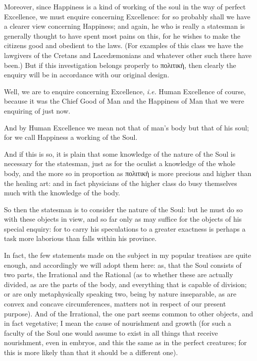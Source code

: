 
Moreover, since Happiness is a kind of working of the soul in the way of
perfect Excellence, we must enquire concerning Excellence: for so probably
shall we have a clearer view concerning Happiness; and again, he who is really
a statesman is generally thought to have spent most pains on this, for he
wishes to make the citizens good and obedient to the laws. (For examples of
this class we have the lawgivers of the Cretans and Lacedæmonians and whatever
other such there have been.) But if this investigation belongs properly to
πολιτικὴ, then clearly the enquiry
will be in accordance with our original design.

Well, we are to enquire concerning Excellence, \emph{i.e.} Human Excellence of
course, because it was the Chief Good of Man and the Happiness of Man that we
were enquiring of just now.

And by Human Excellence we mean not that of man’s body but that of his
soul; for we call Happiness a working of the Soul.

And if this is so, it is plain that some knowledge of the nature of the Soul is
necessary for the statesman, just as for the oculist a knowledge of the whole
body, and the more so in proportion as
πολιτικὴ is more precious and higher
than the healing art: and in fact physicians of the higher class do busy
themselves much with the knowledge of the body.

So then the statesman is to consider the nature of the Soul: but he must do so
with these objects in view, and so far only as may suffice for the objects of
his special enquiry: for to carry his speculations to a greater exactness is
perhaps a task more laborious than falls within his province.

In fact, the few statements made on the subject in my popular treatises are
quite enough, and accordingly we will adopt them here: as, that the Soul
consists of two parts, the Irrational and the Rational (as to whether these are
actually divided, as are the parts of the body, and everything that is capable
of division; or are only metaphysically speaking two, being by nature
inseparable, as are convex and concave circumferences, matters not in respect
of our present purpose). And of the Irrational, the one part seems common to
other objects, and in fact vegetative; I mean the cause of nourishment and
growth (for such a faculty of the Soul one would assume to exist in all things
that receive nourishment, even in embryos, and this the same as in the perfect
creatures; for this is more likely than that it should be a different one).

